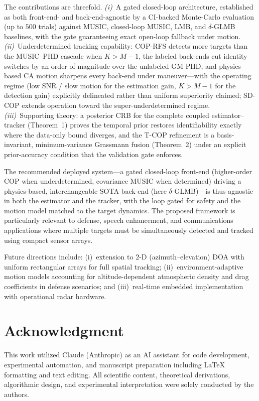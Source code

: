 \documentclass[journal]{IEEEtran}
\begin{document}
The contributions are threefold. \emph{(i)}~A gated closed-loop architecture, established as both front-end- and back-end-agnostic by a CI-backed Monte-Carlo evaluation (up to $500$ trials) against MUSIC, closed-loop MUSIC, LMB, and $\delta$-GLMB baselines, with the gate guaranteeing exact open-loop fallback under motion. \emph{(ii)}~Underdetermined tracking capability: COP-RFS detects more targets than the MUSIC--PHD cascade when $K>M{-}1$, the labeled back-ends cut identity switches by an order of magnitude over the unlabeled GM-PHD, and physics-based CA motion sharpens every back-end under maneuver---with the operating regime (low SNR / slow motion for the estimation gain, $K>M{-}1$ for the detection gain) explicitly delineated rather than uniform superiority claimed; SD-COP extends operation toward the super-underdetermined regime. \emph{(iii)}~Supporting theory: a posterior CRB for the complete coupled estimator--tracker (Theorem~1) proves the temporal prior restores identifiability exactly where the data-only bound diverges, and the T-COP refinement is a basis-invariant, minimum-variance Grassmann fusion (Theorem~2) under an explicit prior-accuracy condition that the validation gate enforces.

The recommended deployed system---a gated closed-loop front-end (higher-order COP when underdetermined, covariance MUSIC when determined) driving a physics-based, interchangeable SOTA back-end (here $\delta$-GLMB)---is thus agnostic in both the estimator and the tracker, with the loop gated for safety and the motion model matched to the target dynamics. The proposed framework is particularly relevant to defense, speech enhancement, and communications applications where multiple targets must be simultaneously detected and tracked using compact sensor arrays.

Future directions include: (i)~extension to 2-D (azimuth--elevation) DOA with uniform rectangular arrays for full spatial tracking; (ii)~environment-adaptive motion models accounting for altitude-dependent atmospheric density and drag coefficients in defense scenarios; and (iii)~real-time embedded implementation with operational radar hardware.

\section*{Acknowledgment}
This work utilized Claude (Anthropic) as an AI assistant for code development, experimental automation, and manuscript preparation including \LaTeX{} formatting and text editing. All scientific content, theoretical derivations, algorithmic design, and experimental interpretation were solely conducted by the authors.



\end{document}
